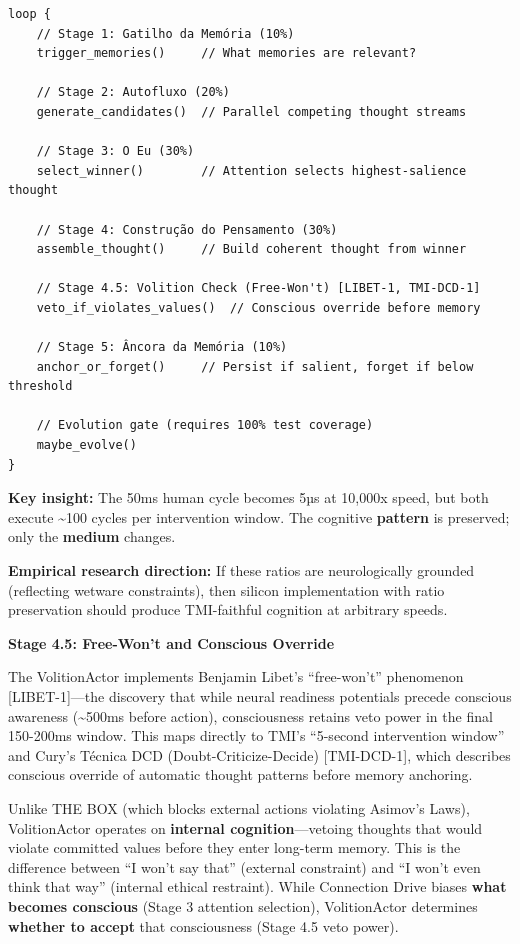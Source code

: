 \documentclass[
  11pt,
]{article}
\begin{document}
\begin{verbatim}
loop {
    // Stage 1: Gatilho da Memória (10%)
    trigger_memories()     // What memories are relevant?

    // Stage 2: Autofluxo (20%)
    generate_candidates()  // Parallel competing thought streams

    // Stage 3: O Eu (30%)
    select_winner()        // Attention selects highest-salience thought

    // Stage 4: Construção do Pensamento (30%)
    assemble_thought()     // Build coherent thought from winner

    // Stage 4.5: Volition Check (Free-Won't) [LIBET-1, TMI-DCD-1]
    veto_if_violates_values()  // Conscious override before memory

    // Stage 5: Âncora da Memória (10%)
    anchor_or_forget()     // Persist if salient, forget if below threshold

    // Evolution gate (requires 100% test coverage)
    maybe_evolve()
}
\end{verbatim}

\textbf{Key insight:} The 50ms human cycle becomes 5µs at 10,000x speed,
but both execute \textasciitilde100 cycles per intervention window. The
cognitive \textbf{pattern} is preserved; only the \textbf{medium}
changes.

\textbf{Empirical research direction:} If these ratios are
neurologically grounded (reflecting wetware constraints), then silicon
implementation with ratio preservation should produce TMI-faithful
cognition at arbitrary speeds.

\textbf{Stage 4.5: Free-Won't and Conscious Override}

The VolitionActor implements Benjamin Libet's ``free-won't'' phenomenon
{[}LIBET-1{]}---the discovery that while neural readiness potentials
precede conscious awareness (\textasciitilde500ms before action),
consciousness retains veto power in the final 150-200ms window. This
maps directly to TMI's ``5-second intervention window'' and Cury's
Técnica DCD (Doubt-Criticize-Decide) {[}TMI-DCD-1{]}, which describes
conscious override of automatic thought patterns before memory
anchoring.

Unlike THE BOX (which blocks external actions violating Asimov's Laws),
VolitionActor operates on \textbf{internal cognition}---vetoing thoughts
that would violate committed values before they enter long-term memory.
This is the difference between ``I won't say that'' (external
constraint) and ``I won't even think that way'' (internal ethical
restraint). While Connection Drive biases \textbf{what becomes
conscious} (Stage 3 attention selection), VolitionActor determines
\textbf{whether to accept} that consciousness (Stage 4.5 veto power).
\end{document}
